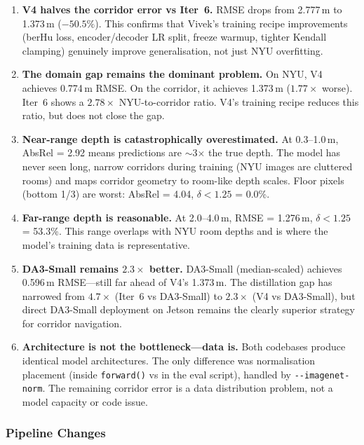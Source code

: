 \documentclass[11pt,a4paper]{article}
\begin{document}
\begin{enumerate}[nosep]
  \item \textbf{V4 halves the corridor error vs Iter~6.}
    RMSE drops from 2.777\,m to 1.373\,m ($-50.5\%$). This confirms that
    Vivek's training recipe improvements (berHu loss, encoder/decoder LR split,
    freeze warmup, tighter Kendall clamping) genuinely improve generalisation,
    not just NYU overfitting.

  \item \textbf{The domain gap remains the dominant problem.}
    On NYU, V4 achieves 0.774\,m RMSE. On the corridor, it achieves 1.373\,m
    ($1.77\times$ worse). Iter~6 shows a $2.78\times$ NYU-to-corridor ratio.
    V4's training recipe reduces this ratio, but does not close the gap.

  \item \textbf{Near-range depth is catastrophically overestimated.}
    At 0.3--1.0\,m, AbsRel = 2.92 means predictions are $\sim$3$\times$ the
    true depth. The model has never seen long, narrow corridors during
    training (NYU images are cluttered rooms) and maps corridor geometry
    to room-like depth scales. Floor pixels (bottom 1/3) are worst:
    AbsRel = 4.04, $\delta < 1.25$ = 0.0\%.

  \item \textbf{Far-range depth is reasonable.}
    At 2.0--4.0\,m, RMSE = 1.276\,m, $\delta < 1.25$ = 53.3\%. This range
    overlaps with NYU room depths and is where the model's training data is
    representative.

  \item \textbf{DA3-Small remains $2.3\times$ better.}
    DA3-Small (median-scaled) achieves 0.596\,m RMSE---still far ahead of
    V4's 1.373\,m. The distillation gap has narrowed from $4.7\times$
    (Iter~6 vs DA3-Small) to $2.3\times$ (V4 vs DA3-Small), but direct
    DA3-Small deployment on Jetson remains the clearly superior strategy
    for corridor navigation.

  \item \textbf{Architecture is not the bottleneck---data is.}
    Both codebases produce identical model architectures.  The only
    difference was normalisation placement (inside \texttt{forward()} vs
    in the eval script), handled by \texttt{-{}-imagenet-norm}. The
    remaining corridor error is a data distribution problem, not a model
    capacity or code issue.
\end{enumerate}

\subsubsection{Pipeline Changes}
\end{document}
